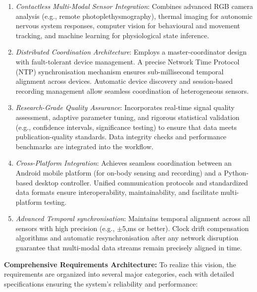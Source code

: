\documentclass[11pt,a4paper]{report}
\begin{document}
\begin{enumerate}
\item \textit{Contactless Multi-Modal Sensor Integration}: Combines advanced RGB camera analysis (e.g., remote photoplethysmography), thermal imaging for autonomic nervous system responses, computer vision for behavioural and movement tracking, and machine learning for physiological state inference.
\item \textit{Distributed Coordination Architecture}: Employs a master-coordinator design with fault-tolerant device management. A precise Network Time Protocol (NTP) synchronisation mechanism ensures sub-millisecond temporal alignment across devices. Automatic device discovery and session-based recording management allow seamless coordination of heterogeneous sensors.
\item \textit{Research-Grade Quality Assurance}: Incorporates real-time signal quality assessment, adaptive parameter tuning, and rigorous statistical validation (e.g., confidence intervals, significance testing) to ensure that data meets publication-quality standards. Data integrity checks and performance benchmarks are integrated into the workflow.
\item \textit{Cross-Platform Integration}: Achieves seamless coordination between an Android mobile platform (for on-body sensing and recording) and a Python-based desktop controller. Unified communication protocols and standardized data formats ensure interoperability, maintainability, and facilitate multi-platform testing.
\item \textit{Advanced Temporal synchronisation}: Maintains temporal alignment across all sensors with high precision (e.g., $\pm$5,ms or better). Clock drift compensation algorithms and automatic resynchronisation after any network disruption guarantee that multi-modal data streams remain precisely aligned in time.
\end{enumerate} \textbf{Comprehensive Requirements Architecture:} To realize this vision, the requirements are organized into several major categories, each with detailed specifications ensuring the system's reliability and performance:
\end{document}

